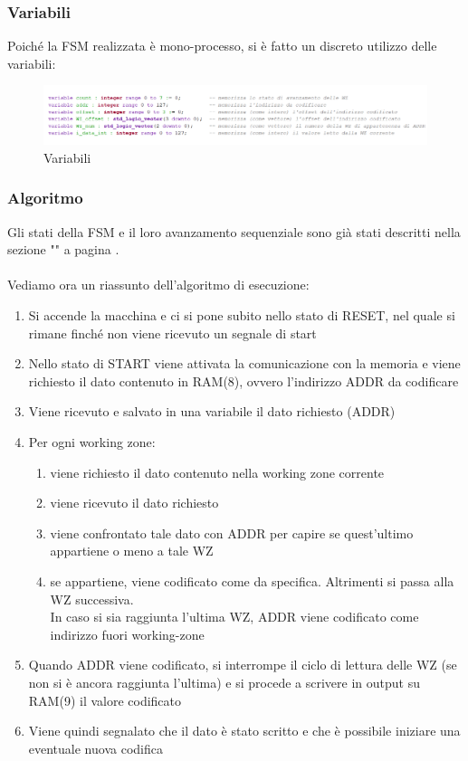 \documentclass{article}
\begin{document}
\subsubsection{Variabili}
Poiché la FSM realizzata è mono-processo, si è fatto un discreto utilizzo delle variabili:
\begin{figure}[H]
    \centering
    \includegraphics[width=1.0\textwidth]{images/variabili.png}
    \caption{Variabili}
    \label{fig:variabili}
\end{figure}

\pagebreak
\subsubsection{Algoritmo}
Gli stati della FSM e il loro avanzamento sequenziale sono già stati descritti nella sezione "" a pagina \pageref{FSM-section}.\\\\
Vediamo ora un riassunto dell'algoritmo di esecuzione:
\begin{enumerate}
\item Si accende la macchina e ci si pone subito nello stato di RESET, nel quale si rimane finché non viene ricevuto un segnale di start
\item Nello stato di START viene attivata la comunicazione con la memoria e viene richiesto il dato contenuto in RAM(8), ovvero l'indirizzo ADDR da codificare
\item Viene ricevuto e salvato in una variabile il dato richiesto (ADDR)
\item Per ogni working zone:
\begin{enumerate}
\item viene richiesto il dato contenuto nella working zone corrente
\item viene ricevuto il dato richiesto
\item viene confrontato tale dato con ADDR per capire se quest'ultimo appartiene o meno a tale WZ
\item se appartiene, viene codificato come da specifica. Altrimenti si passa alla WZ successiva.\\
In caso si sia raggiunta l'ultima WZ, ADDR viene codificato come indirizzo fuori working-zone
\end{enumerate}
\item Quando ADDR viene codificato, si interrompe il ciclo di lettura delle WZ (se non si è ancora raggiunta l'ultima) e si procede a scrivere in output su RAM(9) il valore codificato
\item Viene quindi segnalato che il dato è stato scritto e che è possibile iniziare una eventuale nuova codifica
\end{enumerate}
\end{document}
